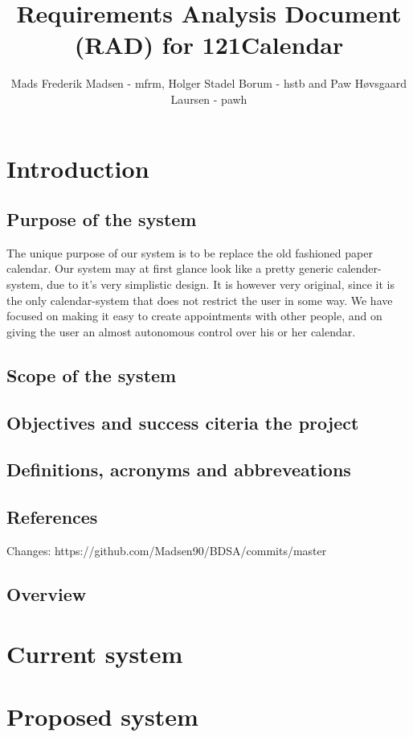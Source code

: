 \documentclass{article}
\begin{document}
\title{Requirements Analysis Document (RAD) for 121Calendar}
\author{Mads Frederik Madsen - mfrm, Holger Stadel Borum - hstb and Paw H\o vsgaard Laursen - pawh}
\maketitle
\tableofcontents

\section{Introduction}
	\subsection{Purpose of the system}
	The unique purpose of our system is to be replace the old fashioned paper calendar. Our system may at first glance look like a pretty generic calender-system, due to it's very simplistic design. It is however very original, since it is the only calendar-system that does not restrict the user in some way. We have focused on making it easy to create appointments with other people, and on giving the user an almost autonomous control over his or her calendar. 
	\subsection{Scope of the system}

	\subsection{Objectives and success citeria the project}
	
	\subsection{Definitions, acronyms and abbreveations}
	
	\subsection{References}
	Changes:
	https://github.com/Madsen90/BDSA/commits/master
	\subsection{Overview}
\section{Current system}
\section{Proposed system}
\end{document}
